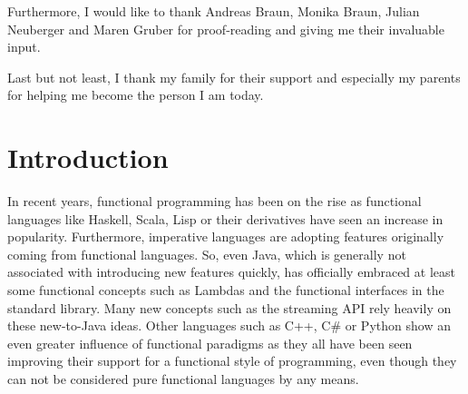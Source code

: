 \documentclass[paper=A4,twoside=true,openright,parskip=full,chapterprefix=true,headings=normal,bibliography=totoc,listof=totoc,titlepage=on,captions=tableabove,draft=false,british]{scrreprt}%
\begin{document}
Furthermore, I would like to thank Andreas Braun, Monika Braun, Julian Neuberger and
Maren Gruber for proof-reading and giving me their invaluable input.

Last but not least, I thank my family for their support and especially my parents
for helping me become the person I am today.

\cleardoublepage

{
\setcounter{tocdepth}{2}
\tableofcontents
}

\cleardoublepage
%

\setcounter{page}{1}			%
\pagestyle{maincontentstyle} 	%

\newcommand{\plusnamesingular}{}
\newcommand{\starnamesingular}{}
\newcommand{\xrefname}[1]{\protect\renewcommand{\plusnamesingular}{#1}}
\newcommand{\Xrefname}[1]{\protect\renewcommand{\starnamesingular}{#1}}
\providecommand{\cref}{\plusnamesingular~\ref}
\providecommand{\Cref}{\starnamesingular~\ref}
\providecommand{\crefformat}[2]{}
\providecommand{\Crefformat}[2]{}

\crefformat{equation}{eq.~#2#1#3}
\Crefformat{equation}{Equation~#2#1#3}
\crefformat{figure}{fig.~#2#1#3}
\Crefformat{figure}{Figure~#2#1#3}

\hypertarget{introduction}{%
\chapter{Introduction}\label{introduction}}

\label{sec:introduction}

In recent years, functional programming has been on the rise as
functional languages like Haskell, Scala, Lisp or their derivatives have
seen an increase in popularity. Furthermore, imperative languages are
adopting features originally coming from functional languages. So, even
Java, which is generally not associated with introducing new features
quickly, has officially embraced at least some functional concepts such
as Lambdas and the functional interfaces in the standard library. Many
new concepts such as the streaming API rely heavily on these new-to-Java
ideas. Other languages such as C++, C\# or Python show an even greater
influence of functional paradigms as they all have been seen improving
their support for a functional style of programming, even though they
can not be considered pure functional languages by any means.
\end{document}
